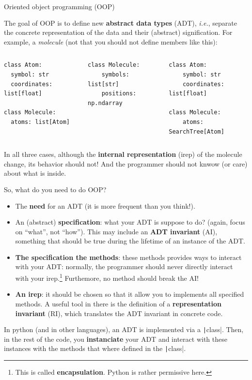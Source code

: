\documentclass[10pt,
aspectratio=169
]{beamer}
\begin{document}
 \begin{frame}[fragile]{Oriented object programming (OOP)}
 	
 	The goal of OOP is to define new \textbf{abstract data types} (ADT), \textit{i.e.}, separate the concrete representation of the data and their (abstract) signification. For example, a \textit{molecule} (not that you should not define members like this):\begin{columns}
 		\begin{verbatim}
class Atom:
  symbol: str
  coordinates: list[float]
 	
class Molecule:
  atoms: list[Atom]
 		\end{verbatim}
 		\begin{verbatim}
class Molecule:
	symbols: list[str]
	positions: np.ndarray
 		\end{verbatim}
\begin{verbatim}
class Atom:
	symbol: str
	coordinates: list[float]

class Molecule:
	atoms: SearchTree[Atom]
\end{verbatim}
 	\end{columns}
In all three cases, although the \textbf{internal representation} (irep) of the molecule change, its behavior should not! And the programmer should not knwow  (or care) about what is inside.
 \end{frame}
 
\begin{frame}
	So, what do you need to do OOP?\begin{itemize}
		\item The \textbf{need} for an ADT (it is more frequent than you think!).
		\item An (abstract) \textbf{specification}: what your ADT is suppose to do? (again, focus on ``what'', not ``how''). This may include an \textbf{ADT invariant} (AI), something that should be true during the lifetime of an instance of the ADT.
		\item \textbf{The specification the methods}: these methods provides ways to interact with your ADT: normally, the programmer should never directly interact with your irep.\footnote{This is called \textbf{encapsulation}. Python is rather permissive here.} Furthemore,  no method should break the AI! 
		\item \textbf{An irep}: it should be chosen so that it allow you to  implements all specified methods. A useful tool in there is the definition of a \textbf{representation invariant} (RI), which translates the ADT invariant in concrete code. 
	\end{itemize}
	In python (and in other languages), an ADT is implemented via a \texttt|class|. Then, in the rest of the code, you \textbf{instanciate} your ADT and interact with these instances with the methods that where defined in the \texttt|class|.
	\vspace{1em}
\end{frame}
\end{document}
